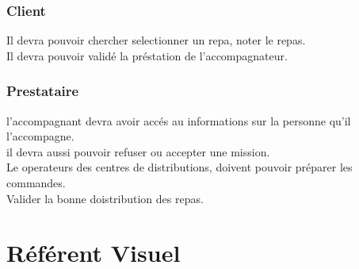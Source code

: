 \documentclass[a4paper,12pt]{article}
\begin{document}
\section{Client}
Il devra pouvoir chercher selectionner un repa, noter le repas.\\
Il devra pouvoir validé la préstation de l'accompagnateur.\\

\section{Prestataire}
 l'accompagnant devra avoir accés au informations sur la personne qu'il l'accompagne.\\
 il devra aussi pouvoir refuser ou accepter une mission.\\

Le operateurs des centres de distributions, doivent pouvoir préparer les commandes.\\
Valider la bonne doistribution des repas.\\

\newpage
\part{Référent Visuel}
\end{document}
